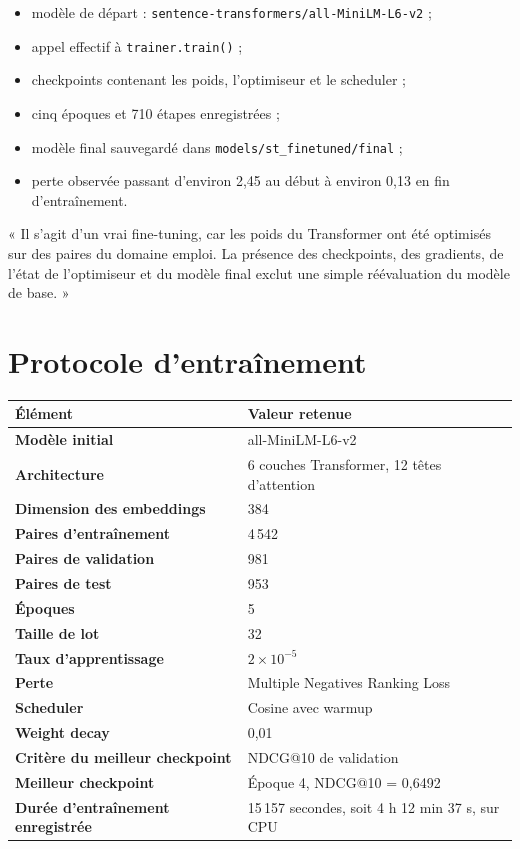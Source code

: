 \documentclass[12pt,a4paper]{article}
\begin{document}
\begin{itemize}
  \item modèle de départ : \texttt{sentence-transformers/all-MiniLM-L6-v2} ;
  \item appel effectif à \texttt{trainer.train()} ;
  \item checkpoints contenant les poids, l'optimiseur et le scheduler ;
  \item cinq époques et 710 étapes enregistrées ;
  \item modèle final sauvegardé dans \texttt{models/st\_finetuned/final} ;
  \item perte observée passant d'environ 2,45 au début à environ 0,13 en fin d'entraînement.
\end{itemize}

\begin{oralbox}
« Il s'agit d'un vrai fine-tuning, car les poids du Transformer ont été optimisés sur des paires
du domaine emploi. La présence des checkpoints, des gradients, de l'état de l'optimiseur et du
modèle final exclut une simple réévaluation du modèle de base. »
\end{oralbox}

\newpage
\section{Protocole d'entraînement}

\begin{tabularx}{\textwidth}{>{\bfseries}p{}X}
\toprule
Élément & Valeur retenue \\
\midrule
Modèle initial & all-MiniLM-L6-v2 \\
Architecture & 6 couches Transformer, 12 têtes d'attention \\
Dimension des embeddings & 384 \\
Paires d'entraînement & 4\,542 \\
Paires de validation & 981 \\
Paires de test & 953 \\
Époques & 5 \\
Taille de lot & 32 \\
Taux d'apprentissage & $2\times10^{-5}$ \\
Perte & Multiple Negatives Ranking Loss \\
Scheduler & Cosine avec warmup \\
Weight decay & 0,01 \\
Critère du meilleur checkpoint & NDCG@10 de validation \\
Meilleur checkpoint & Époque 4, NDCG@10 = 0,6492 \\
Durée d'entraînement enregistrée & 15\,157 secondes, soit 4 h 12 min 37 s, sur CPU \\
\bottomrule
\end{tabularx}
\end{document}

